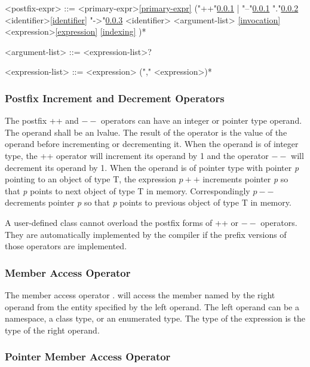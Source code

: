 \documentclass[a4paper,oneside,11pt]{article}
\begin{document}
\begin{grammar}
\label{postfix-expr}<postfix-expr> ::= <primary-expr>\ref{primary-expr}
("++"\ref{postfix-inc-dec} | "--"\ref{postfix-inc-dec}
\alt "."\ref{member-access} <identifier>\ref{identifier}
\alt "->"\ref{ptr-member-access} <identifier>
\alt \lit{(} <argument-list> \lit{)}\ref{invocation}
\alt \lit{[} <expression>\ref{expression} \lit{]}\ref{indexing}
)*

\label{argument-list}<argument-list> ::= <expression-list>?

\label{expression-list}<expression-list> ::= <expression> ("," <expression>)*

\end{grammar}

\subsubsection{Postfix Increment and Decrement Operators}\label{postfix-inc-dec}

The postfix ++ and $--$ operators can have an integer or pointer type operand. The operand shall be an lvalue.
The result of the operator is the value of the operand before incrementing or decrementing it.
When the operand is of integer type, the ++ operator will increment its operand by 1 and the operator $--$ will decrement its operand by 1.
When the operand is of pointer type with pointer \emph{p} pointing to an object of type T,
the expression $p++$ increments pointer \emph{p} so that \emph{p} points to next object of type T in memory.
Correspondingly $p--$ decrements pointer \emph{p} so that \emph{p} points to previous object of type T in memory.

A user-defined class cannot overload the postfix forms of ++ or $--$ operators.
They are automatically implemented by the compiler if the prefix versions of those operators are implemented.

\subsubsection{Member Access Operator}\label{member-access}

The member access operator . will access the member named by the right operand from the entity specified by the left operand.
The left operand can be a namespace, a class type, or an enumerated type.
The type of the expression is the type of the right operand.

\subsubsection{Pointer Member Access Operator}\label{ptr-member-access}
\end{document}
